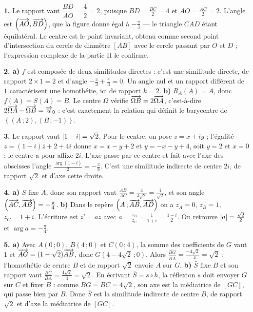 \begin{corrige}[annales]
\textbf{1.} Le rapport vaut $\dfrac{BD}{AO} = \dfrac{4}{2} = 2$, puisque
$BD = \frac{BC}{2} = 4$ et $AO = \frac{AC}{2} = 2$. L'angle est
$\left(\overrightarrow{AO},\overrightarrow{BD}\right)$, que la figure donne égal à
$-\frac{\pi}{3}$ — le triangle $CAD$ étant équilatéral. Le centre est le point
invariant, obtenu comme second point d'intersection du cercle de diamètre
$[AB]$ avec le cercle passant par $O$ et $D$ ; l'expression complexe de la
partie II le confirme.

\textbf{2. a)} $f$ est composée de deux similitudes directes : c'est une
similitude directe, de rapport $2 \times 1 = 2$ et d'angle
$-\frac{\pi}{3}+\frac{\pi}{3} = 0$. Un angle nul et un rapport différent de
$1$ caractérisent une homothétie, ici de rapport $k = 2$.
\textbf{b)} $R_{A}(A) = A$, donc $f(A) = S(A) = B$. Le centre $\Omega$
vérifie $\overrightarrow{\Omega B} = 2\overrightarrow{\Omega A}$, c'est-à-dire
$2\overrightarrow{\Omega A}-\overrightarrow{\Omega B} = \overrightarrow{u}_{0}$ : c'est exactement la relation
qui définit le barycentre de $\left\{(A\,;2),(B\,;-1)\right\}$.

\textbf{3.} Le rapport vaut $\left|1-i\right| = \sqrt2$. Pour le centre, on pose
$z = x+iy$ ; l'égalité $z = (1-i)\overline z+2+4i$ donne
$x = x-y+2$ et $y = -x-y+4$, soit $y = 2$ et $x = 0$ : le centre a pour
affixe $2i$. L'axe passe par ce centre et fait avec l'axe des abscisses
l'angle $\frac{\arg(1-i)}{2} = -\frac{\pi}{8}$. C'est une similitude
indirecte de centre $2i$, de rapport $\sqrt2$ et d'axe cette droite.

\textbf{4. a)} $S$ fixe $A$, donc son rapport vaut
$\frac{AB}{AC} = \frac{4}{4\sqrt2} = \frac{1}{\sqrt2}$, et son angle
$\left(\overrightarrow{AC},\overrightarrow{AB}\right) = -\frac{\pi}{4}$.
\textbf{b)} Dans le repère $\left(A\,;\overrightarrow{AB},\overrightarrow{AD}\right)$ on a
$z_{A} = 0$, $z_{B} = 1$, $z_{C} = 1+i$. L'écriture est $z' = az$ avec
$a = \frac{z_{B}}{z_{C}} = \frac{1}{1+i} = \frac{1-i}{2}$. On retrouve
$\left|a\right| = \frac{\sqrt2}{2}$ et $\arg a = -\frac{\pi}{4}$.

\textbf{5. a)} Avec $A(0\,;0)$, $B(4\,;0)$ et $C(0\,;4)$, la somme des
coefficients de $G$ vaut $1$ et $\overrightarrow{AG} = (1-\sqrt2)\overrightarrow{AB}$, donc
$G\left(4-4\sqrt2\,;0\right)$. Alors
$\frac{\overline{BG}}{\overline{BA}} = \frac{-4\sqrt2}{-4} = \sqrt2$ :
l'homothétie de centre $B$ et de rapport $\sqrt2$ envoie $A$ sur $G$.
\textbf{b)} $\bar S$ fixe $B$ et son rapport vaut
$\frac{BC}{BA} = \frac{4\sqrt2}{4} = \sqrt2$. En écrivant
$\bar S = s \circ h$, la réflexion $s$ doit envoyer $G$ sur $C$ et fixer $B$ :
comme $BG = BC = 4\sqrt2$, son axe est la médiatrice de $[GC]$, qui passe bien
par $B$. Donc $\bar S$ est la similitude indirecte de centre $B$, de rapport
$\sqrt2$ et d'axe la médiatrice de $[GC]$.


\end{corrige}
